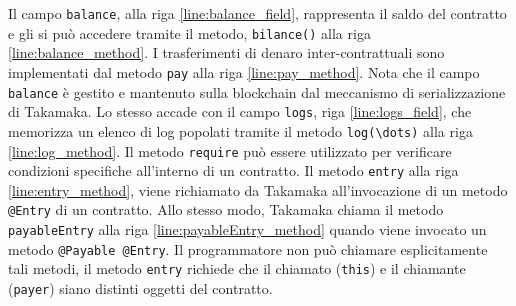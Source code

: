 Il campo \lstinline|balance|, alla riga \ref{line:balance_field}, rappresenta il saldo del contratto e gli si può accedere tramite il metodo, \lstinline|bilance()| alla riga \ref{line:balance_method}. I trasferimenti di denaro inter-contrattuali sono implementati dal metodo \lstinline|pay| alla riga \ref{line:pay_method}. Nota che il campo \lstinline|balance| è gestito e mantenuto sulla blockchain dal meccanismo di serializzazione di Takamaka. Lo stesso accade con il campo \lstinline|logs|, riga \ref{line:logs_field}, che memorizza un elenco di log popolati tramite il metodo \lstinline|log(\dots)| alla riga \ref{line:log_method}. Il metodo \lstinline|require| può essere utilizzato per verificare condizioni specifiche all'interno di un contratto. Il metodo \lstinline|entry| alla riga \ref{line:entry_method}, viene richiamato da Takamaka all'invocazione di un metodo \lstinline|@Entry| di un contratto. Allo stesso modo, Takamaka chiama il metodo \lstinline|payableEntry| alla riga \ref{line:payableEntry_method} quando viene invocato un metodo \lstinline|@Payable @Entry|. Il programmatore non può chiamare esplicitamente tali metodi, il metodo \lstinline|entry| richiede che il chiamato (\lstinline|this|) e il chiamante (\lstinline|payer|) siano distinti oggetti del contratto. 

